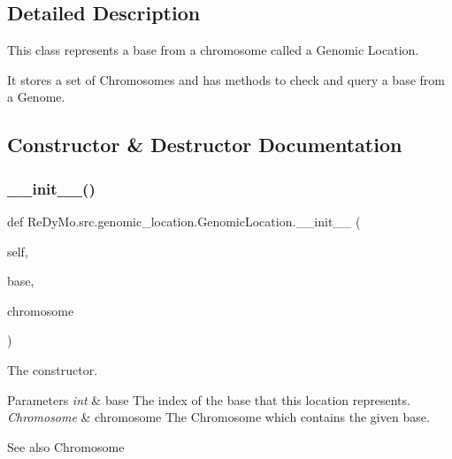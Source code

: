 \subsection{Detailed Description}
This class represents a base from a chromosome called a Genomic Location. 

It stores a set of Chromosomes and has methods to check and query a base from a Genome. 

\subsection{Constructor \& Destructor Documentation}
\mbox{\label{classReDyMo_1_1src_1_1genomic__location_1_1GenomicLocation_ad2fc819130c39efcd02df0b35e6305b3}} 
\subsubsection{\texorpdfstring{\+\_\+\+\_\+init\+\_\+\+\_\+()}{\_\_init\_\_()}}
{\footnotesize\ttfamily def Re\+Dy\+Mo.\+src.\+genomic\+\_\+location.\+Genomic\+Location.\+\_\+\+\_\+init\+\_\+\+\_\+ (\begin{DoxyParamCaption}\item[{}]{self,  }\item[{}]{base,  }\item[{}]{chromosome }\end{DoxyParamCaption})}



The constructor. 


\begin{DoxyParams}{Parameters}
{\em int} & base The index of the base that this location represents. \\
\hline
{\em Chromosome} & chromosome The Chromosome which contains the given base. \\
\hline
\end{DoxyParams}
\begin{DoxySeeAlso}{See also}
Chromosome 
\end{DoxySeeAlso}


